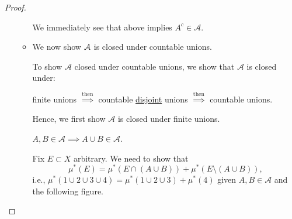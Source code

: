 \begin{proof}
\begin{enumerate}[(1)]
\begin{itemize}
\begin{explanation}
				            We immediately see that above implies \(A^{c} \in\mathcal{A} \).
			            \end{explanation}
			      \item We now show \(\mathcal{\MakeUppercase{a}} \) is closed under countable unions.
			            \begin{note}
				            To show \(\mathcal{A} \) closed under countable unions, we show that \(\mathcal{A}\) is closed under:
				            \begin{center}
					            finite unions \(\overset{\text{then}}{\implies}\) countable \underline{disjoint} unions \(\overset{\text{then}}{\implies}\) countable unions.
				            \end{center}
			            \end{note}
			            Hence, we first show \(\mathcal{A} \) is closed under finite unions.
			            \begin{claim}\label{pf:Caratheodory-extension-Thm-1-finite-unions}
				            \(A, B\in \mathcal{A} \implies A\cup B\in \mathcal{A}\).
			            \end{claim}
			            \begin{explanation}
				            Fix \(E\subset X\) arbitrary. We need to show that
				            \[
					            \mu^{\ast} (E) = \mu^{\ast} (E\cap (A\cup B)) + \mu^{\ast} (E\setminus (A\cup B)),
				            \]
				            i.e.,
				            \(\mu^{\ast} (1\cup 2\cup 3\cup 4) = \mu^{\ast} (1\cup 2\cup 3) + \mu^{\ast} (4)\) given \(A, B\in\mathcal{A}\) and the following figure.
				            \begin{figure}[H]
					            \centering
					            \label{fig:thm:Caratheodory-extension-Thm-1a}
				            \end{figure}


\end{explanation}
\end{itemize}
\end{enumerate}
\end{proof}
